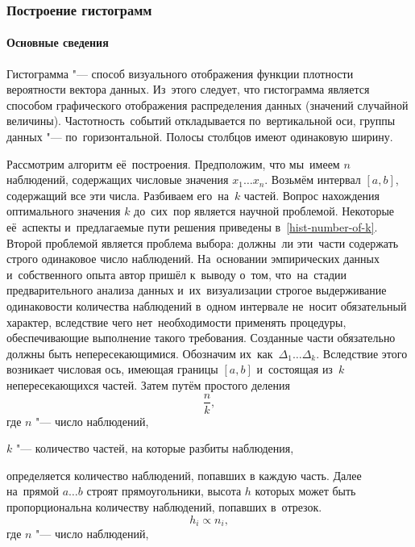 \documentclass[]{scrartcl}
\begin{document}
\subsubsection{Построение гистограмм}
\paragraph{Основные сведения}
\par
Гистограмма "--- способ визуального отображения функции плотности вероятности вектора данных. Из~этого следует, что гистограмма является способом графического отображения распределения данных (значений случайной величины). Частотность~событий откладывается по~вертикальной оси, группы данных "--- по~горизонтальной. Полосы столбцов имеют одинаковую ширину.
\par 
Рассмотрим алгоритм её~построения. Предположим, что мы~имеем $n$ наблюдений, содержащих числовые значения $x_{1}\ldots x_{n}$. Возьмём интервал $[a, b]$, содержащий все эти числа. Разбиваем его~на~$k$ частей. Вопрос нахождения оптимального значения $k$ до~сих~пор является научной проблемой. Некоторые её~аспекты и~предлагаемые пути решения приведены в~\ref{hist-number-of-k}. Второй проблемой является проблема выбора: должны~ли эти~части содержать строго одинаковое число наблюдений. На~основании эмпирических данных и~собственного опыта автор пришёл к~выводу о~том, что~на~стадии предварительного анализа данных и~их~визуализации строгое выдерживание одинаковости количества наблюдений в~одном интервале не~носит обязательный характер, вследствие чего нет~необходимости применять процедуры, обеспечивающие выполнение такого требования. Созданные части обязательно должны быть непересекающимися. Обозначим их~как~$\Delta_{1}\ldots \Delta_{k}$. Вследствие этого возникает числовая ось, имеющая границы $[a, b]$ и~состоящая из~$k$ непересекающихся частей. Затем путём простого деления
\begin{equation}\label{hist-simple}
\frac{n}{k},
\end{equation}
где $n$ "--- число наблюдений,

$k$ "--- количество частей, на которые разбиты наблюдения,
\par
определяется количество наблюдений, попавших в каждую часть. Далее на~прямой $a\ldots b$ строят прямоугольники, высота $h$ которых может быть пропорциональна количеству наблюдений, попавших в~отрезок.
\begin{equation}\label{eq:hist-simple-prop}
h_{i} \propto n_{i},
\end{equation}
где $n$ "--- число наблюдений,
\end{document}
